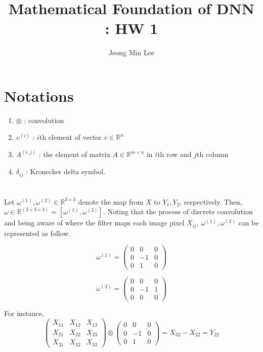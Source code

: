 \documentclass[10pt]{article}
\title{\textbf{Mathematical Foundation of DNN : HW 1}}
\author{Jeong Min Lee}
\begin{document}
\maketitle
\section*{Notations}
\begin{enumerate}
    \item $\otimes$ : convolution
    \item $v^{(i)}$ : $i$th element of vector $v\in \mathbb{R}^n$
    \item $A^{(i,j)}$ : the element of matrix $A\in \mathbb{R}^{m\times n}$ in $i$th row and $j$th column 
    \item $\delta_{ij}$ : Kronecker delta symbol.
\end{enumerate}
\section{}
Let $\omega^{(1)}, \omega^{(2)}\in\mathbb{R}^{3 \times 3}$ denote the map from $X$ to $Y_1, Y_2$, respectively. Then, 
$\omega \in \mathbb{R}^{(2\times 3 \times 3)} = [\omega^{(1)}, \omega^{(2)}]$.
Noting that the process of discrete convolution and being aware of where the filter maps each image pixel $X_{ij}$, 
$\omega^{(1)},\omega^{(2)}$ can be represented as follow.

\begin{equation}
    \omega^{(1)} = \begin{pmatrix}
        0 & 0 & 0 \\ 0 & -1 & 0 \\ 0 & 1 & 0
    \end{pmatrix}
\end{equation}

\begin{equation}
    \omega^{(2)} = \begin{pmatrix}
        0 & 0 & 0 \\ 0 & -1 & 1 \\ 0 & 0 & 0
    \end{pmatrix}
\end{equation}

For instance,
\begin{equation*}
    \begin{pmatrix}
        X_{11} & X_{12} & X_{13} \\ X_{21} & X_{22} & X_{23} \\ X_{31} & X_{32} & X_{33}
    \end{pmatrix}
    \otimes 
    \begin{pmatrix}
        0 & 0 & 0 \\ 0 & -1 & 0 \\ 0 & 1 & 0
    \end{pmatrix}
    = X_{32} - X_{22} = Y_{22}
\end{equation*}
\end{document}
